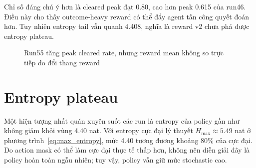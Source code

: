Chỉ số đáng chú ý hơn là cleared peak đạt 0.80, cao hơn peak 0.615 của run46. Điều này cho thấy outcome-heavy reward có thể đẩy agent tấn công quyết đoán hơn. Tuy nhiên entropy tail vẫn quanh 4.408, nghĩa là reward v2 chưa phá được entropy plateau.

\begin{figure}[H]
    \centering
    \caption{Run55 tăng peak cleared rate, nhưng reward mean không so trực tiếp do đổi thang reward}
    \label{fig:reward_v2_clear_peak}
\end{figure}

\section{Entropy plateau}

Một hiện tượng nhất quán xuyên suốt các run là entropy của policy gần như không giảm khỏi vùng 4.40 nat. Với entropy cực đại lý thuyết $H_{\max}\approx 5.49$ nat ở phương trình~\ref{eq:max_entropy}, mức 4.40 tương đương khoảng 80\% của cực đại. Do action mask có thể làm cực đại thực tế thấp hơn, không nên diễn giải đây là policy hoàn toàn ngẫu nhiên; tuy vậy, policy vẫn giữ mức stochastic cao.

